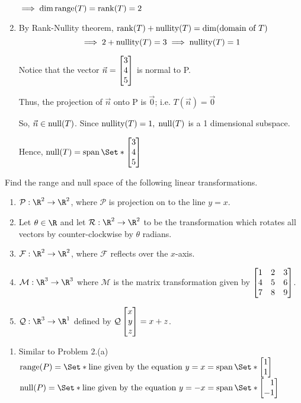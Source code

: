 \begin{exercises}
\begin{problist}
\begin{solution}
\begin{enumerate}
					$\implies \operatorname{dim} \operatorname{range}(T) = \operatorname{rank}(T)=2$

				\item By Rank-Nullity theorem, $\operatorname{rank}(T)+\operatorname{nullity}(T) =
					\operatorname{dim}(\text{domain of }T)$
					\[
						\implies 2+\operatorname{nullity}(T)=3 \implies \operatorname{nullity}(T)=1
					\]


					Notice that the vector $\vec n = \mat{3\\4\\5}$ is
					normal to P.

					Thus, the projection of $\vec n$ onto P is $\vec 0$;
					i.e. $T(\vec n) =\vec 0$

					So, $\vec n\in \operatorname{null}(T)$. Since $\operatorname{nullity}(T)=1, \;\operatorname{null}(T)$
					is a 1 dimensional subspace.

					Hence, $\Null(T) = \Span\Set*{\mat{3\\4\\5}}$
			\end{enumerate}
		\end{solution}

		\prob Find the range and null space of the following linear
		transformations.
		\begin{enumerate}
			\item $\mathcal P:\R^{2}\to\R^{2}$, where $\mathcal P$ is
				projection on to the line $y=x$.

			\item Let $\theta\in \R$ and let $\mathcal R:\R^{2}\to\R^{2}$ to be
				the transformation which rotates all vectors by counter-clockwise
				by $\theta$ radians.

			\item $\mathcal F:\R^{2}\to\R^{2}$, where $\mathcal F$ reflects
				over the $x$-axis.

			\item $\mathcal M:\R^{3}\to\R^{3}$ where $\mathcal M$ is the matrix
				transformation given by $\mat{1&2&3\\4&5&6\\7&8&9}$.

			\item $\mathcal Q:\R^{3}\to\R^{1}$ defined by $\mathcal Q\mat{x\\y\\z}=x+z$.
		\end{enumerate}


		\begin{solution}

			\begin{enumerate}
				\item Similar to Problem 2.(a)
					$\Range(P) = \Set*{\text{line given by the
					equation } y=x}= \Span\Set*{\mat{1\\1}}$
					$\Null(P) = \Set*{\text{line given by the equation }
					y=-x}= \Span\Set*{\mat{1\\-1}}$


\end{enumerate}
\end{solution}
\end{problist}
\end{exercises}
